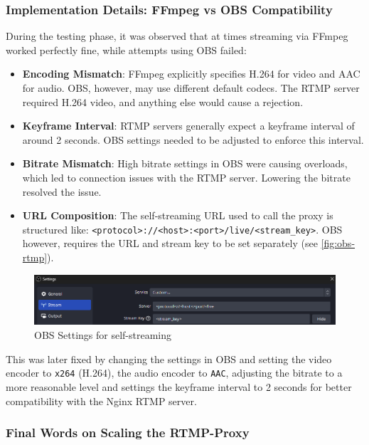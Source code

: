 \subsubsection{Implementation Details: FFmpeg vs OBS Compatibility}

During the testing phase, it was observed that at times streaming via FFmpeg worked perfectly fine, while attempts using OBS failed:
\begin{itemize}
    \item \textbf{Encoding Mismatch}: FFmpeg explicitly specifies H.264 for video and AAC for audio. OBS, however, may use different default codecs. The \ac{RTMP} server required H.264 video, and anything else would cause a rejection.
    \item \textbf{Keyframe Interval}: \ac{RTMP} servers generally expect a keyframe interval of around 2 seconds. OBS settings needed to be adjusted to enforce this interval.
    \item \textbf{Bitrate Mismatch}: High bitrate settings in OBS were causing overloads, which led to connection issues with the \ac{RTMP} server. Lowering the bitrate resolved the issue.
    \item \textbf{URL Composition}: The self-streaming URL used to call the proxy is structured like: \texttt{<protocol>://<host>:<port>/live/<stream\_key>}. OBS however, requires the URL and stream key to be set separately (see \autoref{fig:obs-rtmp}).
\end{itemize}

\begin{figure}[htpb]
    \centering
    \includegraphics[width=\linewidth]{images/OBSRTMP.png}
    \caption[OBS Settings for self-streaming]{OBS Settings for self-streaming}\label{fig:obs-rtmp}
\end{figure}

This was later fixed by changing the settings in OBS and setting the video encoder to \texttt{x264} (H.264), the audio encoder to \texttt{AAC}, adjusting the bitrate to a more reasonable level and settings the keyframe interval to 2 seconds for better compatibility with the Nginx \ac{RTMP} server.

\subsubsection{Final Words on Scaling the RTMP-Proxy}

